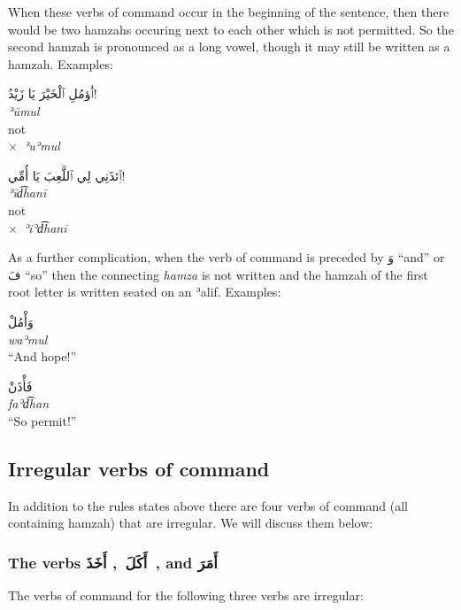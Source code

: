 \documentclass[
  10pt,
]{book}
\begin{document}
When these verbs of command occur in the beginning of the sentence, then there would be two hamzahs occuring next to each other which is not permitted. So the second hamzah is pronounced as a long vowel, though it may still be written as a hamzah. Examples:

\foreignlanguage{arabic}{ٱُؤمُلِ ٱلْخَيْرَ يَا زَيْدُ!}\\
\emph{ʾūmul}\\
not\\
\(\times\)~\emph{ʾuʾmul}

\foreignlanguage{arabic}{ٱِئذَنِي لِي ٱللَّعِبَ يَا أُمِّي!}\\
\emph{ʾīd͡hanī}\\
not\\
\(\times\)~\emph{ʾiʾd͡hanī}

As a further complication, when the verb of command is preceded by
\foreignlanguage{arabic}{وَ} \enquote{and}
or
\foreignlanguage{arabic}{فَ} \enquote{so}
then the connecting \emph{hamza} is not written
and the hamzah of the first root letter is written seated on an ʾalif.
Examples:

\foreignlanguage{arabic}{وَأْمُلْ}\\
\emph{waʾmul}\\
\enquote{And hope!}

\foreignlanguage{arabic}{فَأْذَنْ}\\
\emph{faʾd͡han}\\
\enquote{So permit!}

\subsection{Irregular verbs of command}\label{irregular-verbs-of-command}

In addition to the rules states above there are four verbs of command (all containing hamzah) that are irregular. We will discuss them below:

\subsubsection{\texorpdfstring{The verbs \foreignlanguage{arabic}{أَکَلَ}~, \foreignlanguage{arabic}{أَخَذَ}~, and \foreignlanguage{arabic}{أَمَرَ}}{The verbs أَکَلَ~, أَخَذَ~, and أَمَرَ}}\label{the-verbs-ux623ux643ux644-ux623ux62eux630-and-ux623ux645ux631}

The verbs of command for the following three verbs are irregular:
\end{document}
